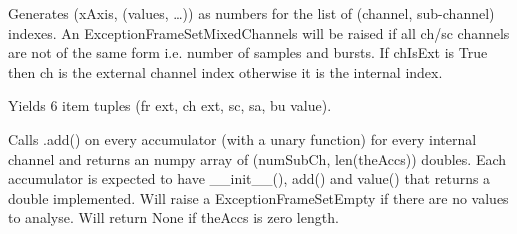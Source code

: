 \documentclass[letterpaper,10pt,english]{sphinxmanual}
\begin{document}
\begin{fulllineitems}

\begin{fulllineitems}
\label{\detokenize{ref/LIS/core/FrameSet:TotalDepth.LIS.core.FrameSet.FrameSet.genMultipleChScPoints}}
Generates (xAxis, (values, …)) as numbers for the list of
(channel, sub-channel) indexes.
An ExceptionFrameSetMixedChannels will be raised if all ch/sc channels
are not of the same form i.e. number of samples and bursts.
If chIsExt is True then ch is the external channel index otherwise
it is the internal index.

\end{fulllineitems}


\begin{fulllineitems}
\label{\detokenize{ref/LIS/core/FrameSet:TotalDepth.LIS.core.FrameSet.FrameSet.genAll}}
Yields 6 item tuples (fr ext, ch ext, sc, sa, bu value).

\end{fulllineitems}


\begin{fulllineitems}
\label{\detokenize{ref/LIS/core/FrameSet:TotalDepth.LIS.core.FrameSet.FrameSet.accumulate}}
Calls .add() on every accumulator (with a unary function) for every
internal channel and returns an numpy array of (numSubCh, len(theAccs))
doubles. Each accumulator is expected to have \_\_init\_\_(), add() and
value() that returns a double implemented.
Will raise a ExceptionFrameSetEmpty if there are no values to analyse.
Will return None if theAccs is zero length.

\end{fulllineitems}


\end{fulllineitems}

\end{document}
